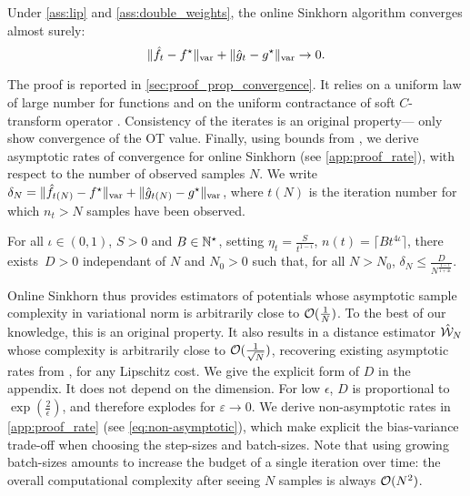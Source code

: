 \begin{proposition}\label{prop:convergence_true}
    Under \autoref{ass:lip} and
    \ref{ass:double_weights}, the online Sinkhorn algorithm converges almost surely:
    \begin{equation}
        \Vert \hat f_t - f^\star \Vert_{\text{\upshape var}} + \Vert \hat g_t - g^\star \Vert_{\text{\upshape var}} \to 0.
    \end{equation}
\end{proposition}

The proof is reported in \autoref{sec:proof_prop_convergence}. It relies on a uniform
law of large number for functions \citep[][chapter
19]{van_der_vaart_asymptotic_2000} and on the uniform contractance of soft
$C$-transform operator \citep[e.g.][Proposition 19]{vialard2019elementary}. Consistency of the iterates is an original property---\cite{2016-genevay-nips} only show convergence of the OT value. Finally, using bounds from \cite{moulines_non-asymptotic_2011}, we derive  asymptotic rates of convergence for online Sinkhorn (see \autoref{app:proof_rate}), with
respect to the number of observed samples $N$. We write $\delta_N = \Vert \hat
f_{t(N)} - f^\star \Vert_{\text{\upshape var}} + \Vert \hat g_{t(N)} - g^\star \Vert_{\text{\upshape var}}$,
where $t(N)$ is the iteration number for which $n_t > N$ samples have been observed.

\begin{proposition}\label{prop:rate}
    For all $\iota \in (0, 1)$, $S > 0$ and $B \in \mathbb{N}^\star$, setting $\eta_t =
    \frac{S}{t^{1 - \iota}}$, $n(t) = \lceil B t^{4\iota} \rceil$, there
    exists~$D > 0$ independant of $N$ and $N_0 > 0$ such that, for all $N >
    N_0$, $\delta_N \leq \frac{D}{N^{\frac{1 - \iota}{1 + 4 \iota}}}$.
\end{proposition}

Online Sinkhorn thus provides estimators of potentials whose asymptotic sample
complexity in variational norm is arbitrarily close to $\mathcal{O}(\frac{1}{N})$. To
the best of our knowledge, this is an original property. It also results in a
distance estimator $\hat {\mathcal{W}}_N$ whose complexity is arbitrarily close to
$\mathcal{O}(\frac{1}{\sqrt{N}})$, recovering existing asymptotic rates from
\cite{2019-Genevay-aistats}, for any Lipschitz cost. We give the explicit form
of $D$ in the appendix. It does not depend on the dimension. For low $\epsilon$,
$D$ is proportional to $\exp(\frac{2}{\epsilon})$, and therefore explodes for
$\varepsilon \to 0$. We derive non-asymptotic rates in \autoref{app:proof_rate}
(see \eqref{eq:non-asymptotic}), which make explicit the bias-variance trade-off
when choosing the step-sizes and batch-sizes. Note that using growing
batch-sizes amounts to increase the budget of a single iteration over time: the
overall computational complexity after seeing $N$ samples is always $\mathcal{O}(N^2)$.

